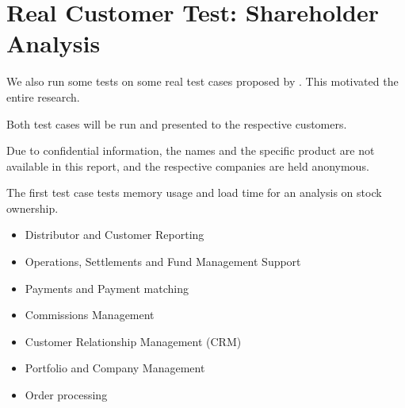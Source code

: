 \section{Real Customer Test: Shareholder Analysis}
\label{sec:Real Customer Test: Shareholder Analysis}
We also run some tests on some real test cases proposed by \genus. This motivated the entire research.

Both test cases will be run and presented to the respective customers.

Due to confidential information, the names and the specific product are not available in this report, and the respective companies are held anonymous.

The first test case tests memory usage and load time for an analysis on stock ownership.
\begin{itemize}
    \item Distributor and Customer Reporting
    \item Operations, Settlements and Fund Management Support
    \item Payments and Payment matching
    \item Commissions Management
    \item Customer Relationship Management (CRM)
    \item Portfolio and Company Management
    \item Order processing
\end{itemize}





